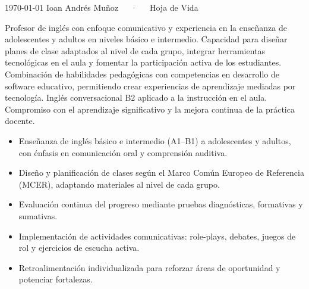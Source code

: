 \documentclass[11pt, a4paper]{awesome-cv}
\begin{document}
\makecvheader[C]

\makecvfooter
  {\today}
  {Ioan Andrés Muñoz~~~·~~~Hoja de Vida}
  {\thepage}


Profesor de inglés con enfoque comunicativo y experiencia en la enseñanza de adolescentes y adultos en niveles básico e intermedio. Capacidad para diseñar planes de clase adaptados al nivel de cada grupo, integrar herramientas tecnológicas en el aula y fomentar la participación activa de los estudiantes. Combinación de habilidades pedagógicas con competencias en desarrollo de software educativo, permitiendo crear experiencias de aprendizaje mediadas por tecnología. Inglés conversacional B2 aplicado a la instrucción en el aula. Compromiso con el aprendizaje significativo y la mejora continua de la práctica docente.


\begin{itemize}
  \item Enseñanza de inglés básico e intermedio (A1--B1) a adolescentes y adultos, con énfasis en comunicación oral y comprensión auditiva.
  \item Diseño y planificación de clases según el Marco Común Europeo de Referencia (MCER), adaptando materiales al nivel de cada grupo.
  \item Evaluación continua del progreso mediante pruebas diagnósticas, formativas y sumativas.
  \item Implementación de actividades comunicativas: role-plays, debates, juegos de rol y ejercicios de escucha activa.
  \item Retroalimentación individualizada para reforzar áreas de oportunidad y potenciar fortalezas.
\end{itemize}

\end{document}
